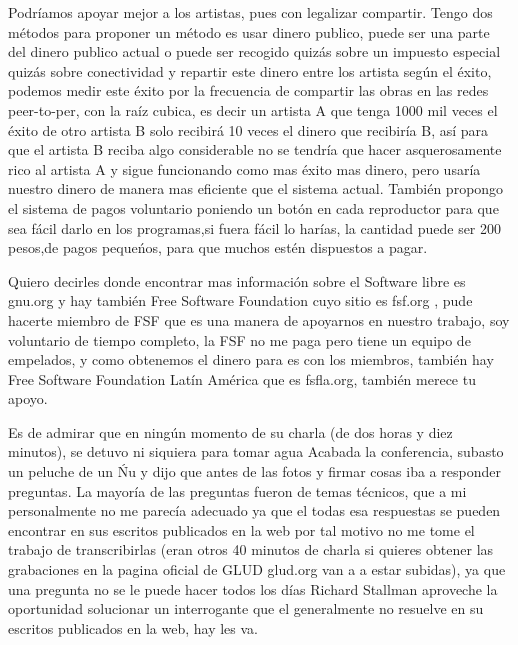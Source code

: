 \begin{multicols}{2}
Podríamos apoyar mejor a los artistas, pues con legalizar compartir. Tengo dos métodos para proponer un método es usar dinero publico, puede ser una parte del dinero publico actual o puede ser recogido quizás sobre un impuesto especial quizás sobre conectividad y repartir este dinero entre los artista según el éxito, podemos medir este éxito por la frecuencia de compartir las obras en las redes peer-to-per, con la raíz cubica, es decir un artista A que tenga 1000 mil veces el éxito de otro artista B solo recibirá 10 veces el dinero que recibiría B, así para que el artista B reciba algo considerable no se tendría que hacer asquerosamente rico al artista A y sigue funcionando como mas éxito mas dinero, pero {\em {\color{introcolor}{ se transfiere la mayoría del dinero desde las pocas estrellas a los muchos artistas igualmente capaces de éxito mediano, a los que realmente necesitan mas apoyo, }}}usaría nuestro dinero de manera mas eficiente que el sistema actual. También propongo el sistema de pagos voluntario poniendo un botón en cada reproductor para que sea fácil darlo en los programas,si fuera fácil lo harías, la cantidad puede ser 200 pesos,de pagos pequeńos, para que muchos estén dispuestos a pagar. 



Quiero decirles donde encontrar mas información sobre el Software libre es gnu.org  y hay también Free Software Foundation cuyo sitio es fsf.org , pude hacerte miembro de FSF que es una manera de apoyarnos en nuestro trabajo, soy voluntario de tiempo completo, la FSF no me paga pero tiene un equipo de empelados, y como obtenemos el dinero para es con  los miembros, también hay Free Software Foundation Latín América  que es fsfla.org, también merece tu apoyo.


Es de admirar que en ningún momento de su charla (de dos horas y diez minutos), se detuvo ni siquiera para tomar agua  Acabada la conferencia, subasto un peluche de un Ńu y dijo que antes de las fotos y firmar cosas iba a responder preguntas. La mayoría de las preguntas fueron de temas técnicos, que a mi personalmente no me parecía adecuado ya que el todas esa respuestas se pueden encontrar en  sus escritos publicados en la web por tal motivo no me tome el trabajo de transcribirlas (eran otros 40 minutos de charla si quieres obtener las grabaciones en la pagina oficial de GLUD  glud.org van a a estar subidas), ya que una pregunta no se le puede hacer todos los días Richard Stallman aproveche la oportunidad solucionar un interrogante que el generalmente no resuelve en su escritos publicados en la web, hay les va.





\end{multicols}
